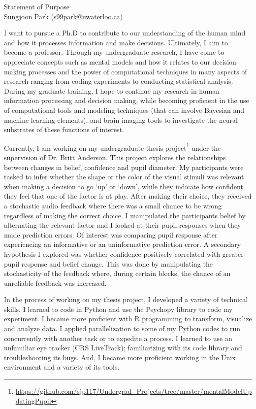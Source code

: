 \documentclass[12pt]{article}
\let\oldcenter\center
\let\oldendcenter\endcenter
\renewenvironment{center}{\setlength\topsep{-1pt}\oldcenter}{\oldendcenter}
\begin{document}
	
	\begin{center}
		{\Large Statement of Purpose} \\
		{\normalsize Sungjoon Park (\href{mailto:s99park@uwaterloo.ca}{s99park@uwaterloo.ca})}
	\end{center}
	
	I want to pursue a Ph.D to contribute to our understanding of the human mind and how it processes information and make decisions. Ultimately, I aim to become a professor. Through my undergraduate research, I have come to appreciate concepts such as mental models and how it relates to our decision making processes and the power of computational techniques in many aspects of research ranging from coding experiments to conducting statistical analysis. During my graduate training, I hope to continue my research in human information processing and decision making, while becoming proficient in the use of computational tools and modeling techniques (that can involve Bayesian and machine learning elements), and brain imaging tools to investigate the neural substrates of these functions of interest.
	
	Currently, I am working on my undergraduate thesis \href{https://github.com/sjp117/Undergrad_Projects/tree/master/mentalModelUpdatingPupil}{project}\footnote{\url{https://github.com/sjp117/Undergrad\_Projects/tree/master/mentalModelUpdatingPupil}} under the supervision of Dr. Britt Anderson. This project explores the relationships between changes in belief, confidence and pupil diameter. My participants were tasked to infer whether the shape or the color of the visual stimuli was relevant when making a decision to go `up' or `down', while they indicate how confident they feel that one of the factor is at play. After making their choice, they received a stochastic audio feedback where there was a small chance to be wrong regardless of making the correct choice. I manipulated the participants belief by alternating the relevant factor and I looked at their pupil responses when they made prediction errors. Of interest was comparing pupil response after experiencing an informative or an uninformative prediction error. A secondary hypothesis I explored was whether confidence positively correlated with greater pupil response and belief change. This was done by manipulating the stochasticity of the feedback where, during certain blocks, the chance of an unreliable feedback was increased.
	
	In the process of working on my thesis project, I developed a variety of technical skills. I learned to code in Python and use the Psychopy library to code my experiment. I became more proficient with R programming to transform, visualize and analyze data. I applied parallelization to some of my Python codes to run concurrently with another task or to expedite a process. I learned to use an unfamiliar eye tracker (CRS LiveTrack); familiarizing with its code library and troubleshooting its bugs. And, I became more proficient working in the Unix environment and a variety of its tools. 
	
\end{document}
